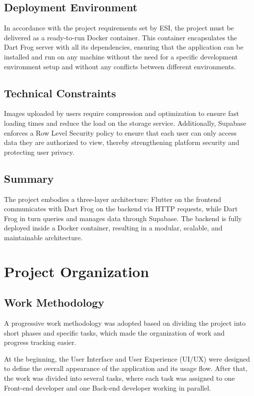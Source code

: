 \documentclass[12pt]{article}
\begin{document}
\subsection{Deployment Environment}
In accordance with the project requirements set by ESI, the project must be delivered as a ready-to-run Docker container. This container encapsulates the Dart Frog server with all its dependencies, ensuring that the application can be installed and run on any machine without the need for a specific development environment setup and without any conflicts between different environments.

\subsection{Technical Constraints}
Images uploaded by users require compression and optimization to ensure fast loading times and reduce the load on the storage service. Additionally, Supabase enforces a Row Level Security policy to ensure that each user can only access data they are authorized to view, thereby strengthening platform security and protecting user privacy.
\subsection{Summary}
The project embodies a three-layer architecture: Flutter on the frontend communicates with Dart Frog on the backend via HTTP requests, while Dart Frog in turn queries and manages data through Supabase. The backend is fully deployed inside a Docker container, resulting in a modular, scalable, and maintainable architecture.

\newpage

\section{Project Organization}
\subsection{Work Methodology}

A progressive work methodology was adopted based on dividing the project into short phases and specific tasks, which made the organization of work and progress tracking easier.

At the beginning, the User Interface and User Experience (UI/UX) were designed to define the overall appearance of the application and its usage flow. After that, the work was divided into several tasks, where each task was assigned to one Front-end developer and one Back-end developer working in parallel.
\end{document}
